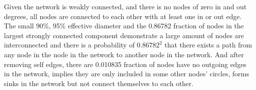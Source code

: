 \documentclass{subfiles}
\begin{document}
  Given the network is weakly connected, and there is no nodes of zero in and out degrees, all nodes are connected to each other with at least one in or out edge. The small 90\%, 95\% effective diameter and the 0.86782 fraction of nodes in the largest strongly connected component demonstrate a large amount of nodes are interconnected and there is a probability of \(0.86782^2\) that there exists a path from any node in the node in the network to another node in the network. And after removing self edges, there are 0.010835 fraction of nodes have no outgoing edges in the network, implies they are only included in some other nodes' circles, forms sinks in the network but not connect themselves to each other.
\end{document}
